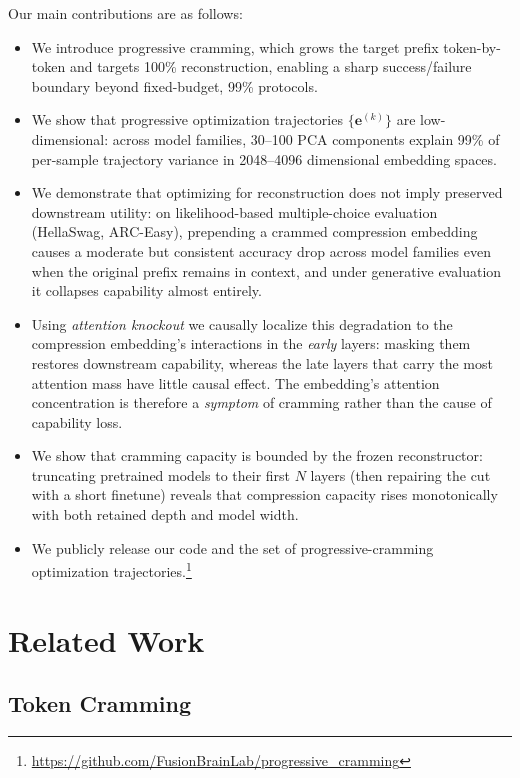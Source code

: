 \documentclass{article}
\theoremstyle{plain}
\theoremstyle{definition}
\theoremstyle{remark}
\begin{document}
Our main contributions are as follows:
\begin{itemize}
    \item We introduce progressive cramming, which grows the target prefix token-by-token and targets 100\% reconstruction, enabling a sharp success/failure boundary beyond fixed-budget, 99\% protocols.
    \item We show that progressive optimization trajectories $\{\mathbf{e}^{(k)}\}$ are low-dimensional: across model families, 30--100 PCA components explain 99\% of per-sample trajectory variance in 2048--4096 dimensional embedding spaces.
    \item We demonstrate that optimizing for reconstruction does not imply preserved downstream utility: on likelihood-based multiple-choice evaluation (HellaSwag, ARC-Easy), prepending a crammed compression embedding causes a moderate but consistent accuracy drop across model families even when the original prefix remains in context, and under generative evaluation it collapses capability almost entirely.
    \item Using \emph{attention knockout} we causally localize this degradation to the compression embedding's interactions in the \emph{early} layers: masking them restores downstream capability, whereas the late layers that carry the most attention mass have little causal effect. The embedding's attention concentration is therefore a \emph{symptom} of cramming rather than the cause of capability loss.
    \item We show that cramming capacity is bounded by the frozen reconstructor: truncating pretrained models to their first $N$ layers (then repairing the cut with a short finetune) reveals that compression capacity rises monotonically with both retained depth and model width.
    \item We publicly release our code and the set of progressive-cramming optimization trajectories.\footnote{\url{https://github.com/FusionBrainLab/progressive_cramming}}
\end{itemize}



\section{Related Work}
\label{sec:related_work}


\subsection{Token Cramming}
\end{document}
